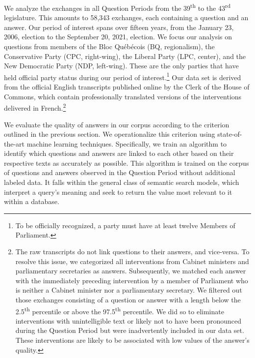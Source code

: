 {{We analyze the exchanges in all Question Periods from the 39\textsuperscript{th} to the 43\textsuperscript{rd} legislature. This amounts to 58,343 exchanges, each containing a question and an answer. Our period of interest spans over fifteen years, from the January 23, 2006, election to the September 20, 2021, election. We focus our analysis on questions from members of the Bloc Québécois (BQ, regionalism), the Conservative Party (CPC, right-wing), the Liberal Party (LPC, center), and the New Democratic Party (NDP, left-wing). These are the only parties that have held official party status during our period of interest.\footnote{To be officially recognized, a party must have at least twelve Members of Parliament.} Our data set is derived from the official English transcripts published online by the Clerk of the House of Commons, which contain professionally translated versions of the interventions delivered in French.\footnote{The raw transcripts do not link questions to their answers, and vice-versa. To resolve this issue, we categorized all interventions from Cabinet ministers and parliamentary secretaries as answers. Subsequently, we matched each answer with the immediately preceding intervention by a member of Parliament who is neither a Cabinet minister nor a parliamentary secretary. We filtered out those exchanges consisting of a question or answer with a length below the 2.5\textsuperscript{th} percentile or above the 97.5\textsuperscript{th} percentile. We did so to eliminate interventions with unintelligible text or likely not to have been pronounced during the Question Period but were inadvertently included in our data set. These interventions are likely to be associated with low values of the answer’s quality.}

We evaluate the quality of answers in our corpus according to the criterion outlined in the previous section. We operationalize this criterion using state-of-the-art machine learning techniques. Specifically, we train an algorithm to identify which questions and answers are linked to each other based on their respective texts as accurately as possible. This algorithm is trained on the corpus of questions and answers observed in the Question Period without additional labeled data. It falls within the general class of semantic search models, which interpret a query's meaning and seek to return the value most relevant to it within a database.

}}
